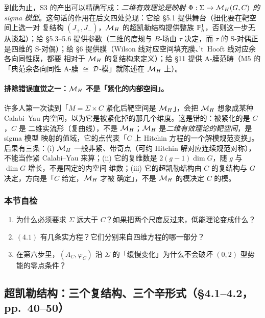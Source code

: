 到此为止，S3 的产出可以精确写成：\emph{二维有效理论是映射 $\Phi:\Sigma\to\mathcal{M}_H(G,C)$ 的
sigma 模型}。这句话的作用在后文四处兑现：它给 §5.1 提供舞台（扭化要在靶空间上选一对
复结构 $(J_+,J_-)$，$\mathcal{M}_H$ 的超凯勒结构提供整族 $\mathbb{P}^1_h$，否则这一步无从谈起）；给
§5.3--5.6 提供参数（二维的度规与 $B$-场由 $\tau$ 决定，而 $\tau$ 的 S-对偶正是四维的
S-对偶）；给 §6 提供膜（Wilson 线对应空间填充膜、't~Hooft 线对应余各向同性膜，都要
相对于 $\mathcal{M}_H$ 的复结构来定义）；给 §11 提供 A-膜范畴（M5 的「典范余各向同性 A-膜
$\cong$ $\mathcal{D}$-模」就陈述在 $\mathcal{M}_H$ 上）。\pA{}\pA{}

\paragraph{排除错误直觉之一：$\mathcal{M}_H$ 不是「紧化的内部空间」。}
许多人第一次读到「$M=\Sigma\times C$ 紧化后靶空间是 $\mathcal{M}_H$」，会把 $\mathcal{M}_H$ 想象成某种
Calabi--Yau 内空间，以为它是被紧化掉的那几个维度。这是错的：被紧化的是 $C$，$C$ 是
二维实流形（复曲线），不是 $\mathcal{M}_H$；$\mathcal{M}_H$ 是\emph{二维有效理论的靶空间}，是 sigma 模型
映射的值域，它的点代表「$C$ 上 Hitchin 方程的一个解模规范变换」。后果有三条：(i)
$\mathcal{M}_H$ 一般非紧、带奇点（可约 Hitchin 解对应连续规范对称），不能当作紧 Calabi--Yau
来算；(ii) 它的复维数是 $2(g-1)\dim G$，随 $g$ 与 $\dim G$ 增长，不是固定的内空间
维数；(iii) 它的超凯勒结构由 $C$ 的复结构与 $G$ 决定，方向是「$C$ 给定，$\mathcal{M}_H$ 才被
确定」，不是 $\mathcal{M}_H$ 的模决定 $C$ 的模。\pB{}\pA{}

\subsubsection*{本节自检}
\begin{enumerate}
\item 为什么必须要求 $\Sigma$ 远大于 $C$？如果把两个尺度反过来，低能理论变成什么？
\item $(4.1)$ 有几条实方程？它们分别来自四维方程的哪一部分？
\item 在第六步里，$(A_C,\varphi_C)$ 沿 $\Sigma$ 的「缓慢变化」为什么不会破坏
$(0,2)$ 型势能的零点条件？
\end{enumerate}

\subsection{超凯勒结构：三个复结构、三个辛形式（§4.1--4.2，pp.~40--50）}
\label{sec:fh-hk}

